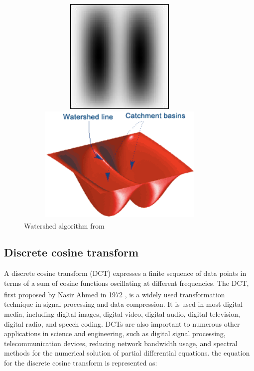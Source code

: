 \begin{figure}[H]
\centering
\begin{minipage}{.33\textwidth}
  \centering
  \centerline{\includegraphics[width = 4in, height = 2.2in]{../images/watershed_example.jpg}}
\end{minipage}

\begin{minipage}{.33\textwidth}
  \centering
  \centerline{\includegraphics[width = 4in, height = 2.2in]{../images/watershed_relief.png}}
\end{minipage}
  \caption{Watershed algorithm from \textsuperscript{\cite{Steve_Eddins_2022_mathworks}}}
\end{figure}

\subsection{Discrete cosine transform}
A discrete cosine transform (DCT) expresses a finite sequence of data points in terms of a sum of cosine functions oscillating at different frequencies. The DCT, first proposed by Nasir Ahmed in 1972 \textsuperscript{\cite{ahmed1974discrete}}, is a widely used transformation technique in signal processing and data compression. It is used in most digital media, including digital images, digital video, digital audio, digital television, digital radio, and speech coding. DCTs are also important to numerous other applications in science and engineering, such as digital signal processing, telecommunication devices, reducing network bandwidth usage, and spectral methods for the numerical solution of partial differential equations.
the equation for the discrete cosine transform is represented as:

